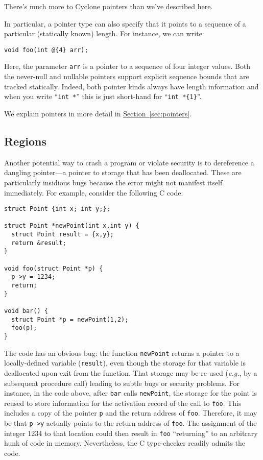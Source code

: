 There's much more to Cyclone pointers than we've described here.  

In particular, a pointer type can also specify that it points to a
sequence of a particular (statically known) length.  For instance, we
can write:
\begin{verbatim}
void foo(int @{4} arr);
\end{verbatim}
Here, the parameter \texttt{arr} is a pointer to a sequence of
four integer values.  Both the never-null and nullable pointers
support explicit sequence bounds that are tracked statically.
Indeed, both pointer kinds always have length information and
when you write ``\texttt{int *}'' this is just short-hand for
``\texttt{int *\{1\}}''.

We explain pointers in more detail in
\hyperref[{sec:pointers}]{Section~\ref{sec:pointers}}.

\subsection{Regions}

Another potential way to crash a program or violate security is
to dereference a dangling pointer---a pointer to storage that
has been deallocated.  These are particularly insidious bugs
because the error might not manifest itself immediately.  
For example, consider the following C code:
\begin{verbatim}
struct Point {int x; int y;};

struct Point *newPoint(int x,int y) {
  struct Point result = {x,y};
  return &result;
}

void foo(struct Point *p) {
  p->y = 1234;
  return;
}

void bar() {
  struct Point *p = newPoint(1,2);
  foo(p);
}
\end{verbatim}
The code has an obvious bug: the function \texttt{newPoint} returns a
pointer to a locally-defined variable (\texttt{result}), even though
the storage for that variable is deallocated upon exit from the
function.  That storage may be re-used (\emph{e.g.}, by a subsequent procedure
call) leading to subtle bugs or security problems.  For instance, in
the code above, after \texttt{bar} calls \texttt{newPoint}, the storage
for the point is reused to store information for the activation
record of the call to \texttt{foo}.  This includes a copy of the
pointer \texttt{p} and the return address of \texttt{foo}.  Therefore,
it may be that \texttt{p->y} actually points to the return address of
\texttt{foo}. The assignment of the integer 1234 to that location could
then result in \texttt{foo} ``returning'' to an arbitrary hunk of code
in memory.  Nevertheless, the C type-checker readily
admits the code.

